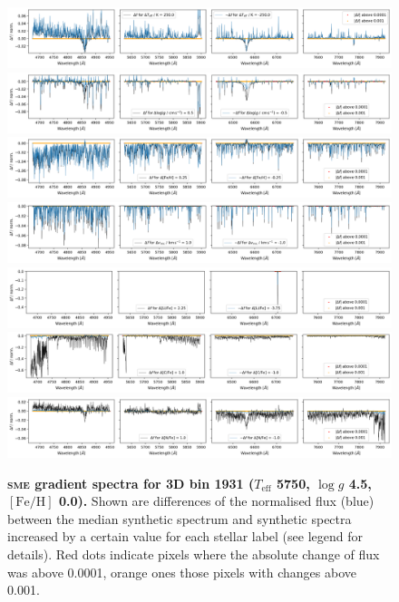 \documentclass[
  journal=pasa,
  manuscript=research-paper, %
  year=2021,
  volume=37,
]{cup-journal}
\newcommand{\Teff}{$T_\mathrm{eff}$\xspace}
\newcommand{\logg}{$\log g$\xspace}
\newcommand{\feh}{$\mathrm{[Fe/H]}$\xspace}
\newcommand{\sme}{\textsc{sme}\xspace}
\begin{document}
\begin{figure}[h!]
 \centering
 \includegraphics[width=\textwidth]{figures/gradient_spectrum_1931_teff.png}
 \includegraphics[width=\textwidth]{figures/gradient_spectrum_1931_logg.png}
 \includegraphics[width=\textwidth]{figures/gradient_spectrum_1931_fe_h.png}
  \includegraphics[width=\textwidth]{figures/gradient_spectrum_1931_vmic.png}
 \includegraphics[width=\textwidth]{figures/gradient_spectrum_1931_li_fe.png}
 \includegraphics[width=\textwidth]{figures/gradient_spectrum_1931_c_fe.png}
 \includegraphics[width=\textwidth]{figures/gradient_spectrum_1931_n_fe.png}

 \caption{\textbf{\sme gradient spectra for 3D bin 1931 (\Teff 5750, \logg 4.5, \feh 0.0).} Shown are differences of the normalised flux (blue) between the median synthetic spectrum and synthetic spectra increased by a certain value for each stellar label (see legend for details). Red dots indicate pixels where the absolute change of flux was above 0.0001, orange ones those pixels with changes above 0.001.
} \label{fig:gradient_spectra_1931_1}
\end{figure}
\end{document}
